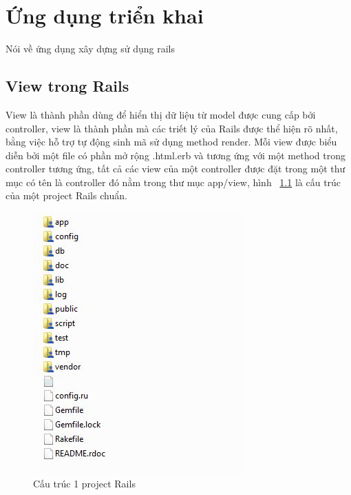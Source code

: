 \chapter{Ứng dụng triển khai}
Nói về ứng dụng xây dựng sử dụng rails
\section{View trong Rails}
View là thành phần dùng để hiển thị dữ liệu từ model được cung cấp bởi controller, view là thành phần mà các triết lý của Rails được thể hiện rõ nhất, bằng việc hỗ trợ tự động sinh mã sử dụng method render.
Mỗi view được biểu diễn bởi một file có phần mở rộng .html.erb và tương ứng với một method trong controller tương ứng, tất cả các view của một controller được đặt trong một thư mục có tên là controller đó nằm trong thư mục app/view, hình ~\ref{fig:d} là cấu trúc của một project Rails chuẩn.
\begin{figure}
	\centering
		\includegraphics{image/d.JPG}
	\caption{Cấu trúc 1 project Rails}
	\label{fig:d}
\end{figure}
